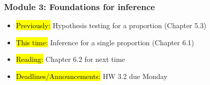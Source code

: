 
\begin{frame}
    \frametitle{Module 3: Foundations for inference}
    \begin{itemize}
        \item \hl{Previously: }Hypothesis testing for a proportion (Chapter 5.3)
        \item \hl{This time: }Inference for a single proportion (Chapter 6.1)
        \item \hl{Reading: }Chapter 6.2 for next time
        \item \hl{Deadlines/Announcements: }HW 3.2 due Monday
    \end{itemize}
    
\end{frame}